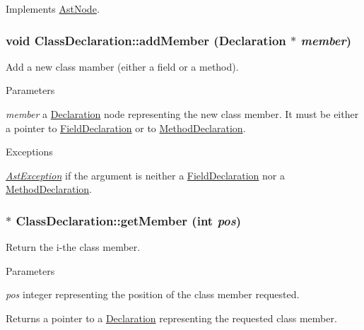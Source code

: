 Implements \hyperlink{classAstNode_a67b2d6ce1262da2954fb4db255759fb3}{AstNode}.\hypertarget{classClassDeclaration_a4d48dcc425315c542f1bee48287fb237}{
\subsubsection[{addMember}]{\setlength{\rightskip}{0pt plus 5cm}void ClassDeclaration::addMember ({\bf Declaration} $\ast$ {\em member})}}
\label{classClassDeclaration_a4d48dcc425315c542f1bee48287fb237}
Add a new class mamber (either a field or a method).


\begin{DoxyParams}{Parameters}
\item[{\em member}]a \hyperlink{classDeclaration}{Declaration} node representing the new class member. It must be either a pointer to \hyperlink{classFieldDeclaration}{FieldDeclaration} or to \hyperlink{classMethodDeclaration}{MethodDeclaration}. \end{DoxyParams}

\begin{DoxyExceptions}{Exceptions}
\item[{\em \hyperlink{classAstException}{AstException}}]if the argument is neither a \hyperlink{classFieldDeclaration}{FieldDeclaration} nor a \hyperlink{classMethodDeclaration}{MethodDeclaration}. \end{DoxyExceptions}
\hypertarget{classClassDeclaration_a2a905ef9d8d1034606f554917c1a83f6}{
\subsubsection[{getMember}]{$\ast$ ClassDeclaration::getMember (int {\em pos})}}
\label{classClassDeclaration_a2a905ef9d8d1034606f554917c1a83f6}
Return the i-\/the class member.


\begin{DoxyParams}{Parameters}
\item[{\em pos}]integer representing the position of the class member requested. \end{DoxyParams}
\begin{DoxyReturn}{Returns}
a pointer to a \hyperlink{classDeclaration}{Declaration} representing the requested class member. 
\end{DoxyReturn}

